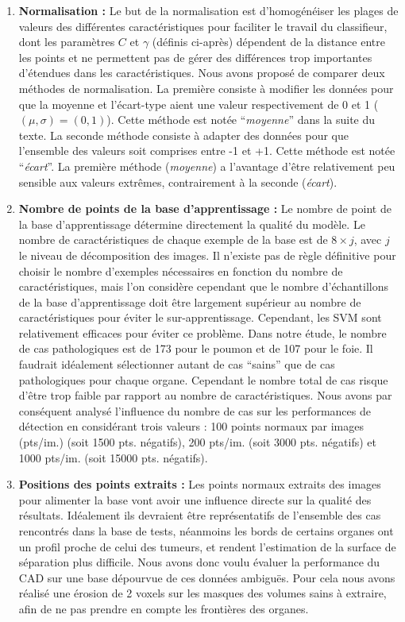 \begin{enumerate}
 \item \textbf{Normalisation :} Le but de la normalisation est d'homogénéiser les plages de valeurs des différentes caractéristiques pour faciliter le travail du classifieur, dont les paramètres $C$ et $\gamma$ (définis ci-après) dépendent de la distance entre les points et ne permettent pas de gérer des différences trop importantes d'étendues dans les caractéristiques.  Nous avons proposé de comparer deux méthodes de normalisation. La première consiste à modifier les données pour que la moyenne et l'écart-type aient une valeur respectivement de 0 et 1 ($(\mu, \sigma)=(0,1)$). Cette méthode est notée ``\emph{moyenne}'' dans la suite du texte. La seconde méthode consiste à adapter des données pour que l'ensemble des valeurs soit comprises entre -1 et +1. Cette méthode est notée ``\emph{écart}''. La première méthode (\emph{moyenne}) a l'avantage d'être relativement peu sensible aux valeurs extrêmes, contrairement à la seconde (\emph{écart}).


 \item \textbf{Nombre de points de la base d'apprentissage :} Le nombre de point de la base d'apprentissage détermine directement la qualité du modèle. Le nombre de caractéristiques de chaque exemple de la base est de $8 \times j$, avec $j$ le niveau de décomposition des images. Il n'existe pas de règle définitive pour choisir le nombre d'exemples nécessaires en fonction du nombre de caractéristiques, mais l'on considère cependant que le nombre d'échantillons de la base d'apprentissage doit être largement supérieur au nombre de caractéristiques pour éviter le sur-apprentissage. Cependant, les SVM sont relativement efficaces pour éviter ce problème. Dans notre étude, le nombre de cas pathologiques est de 173 pour le poumon et de 107 pour le foie. Il faudrait idéalement sélectionner autant de cas ``sains'' que de cas pathologiques pour chaque organe. Cependant le nombre total de cas risque d'être trop faible par rapport au nombre de caractéristiques. Nous avons par conséquent analysé l'influence du nombre de cas sur les performances de détection en considérant trois valeurs : 100 points normaux par images (pts/im.) (soit 1500 pts. négatifs), 200 pts/im. (soit 3000 pts. négatifs) et 1000 pts/im. (soit 15000 pts. négatifs).


 \item \textbf{Positions des points extraits :} Les points normaux extraits des images pour alimenter la base vont avoir une influence directe sur la qualité des résultats. Idéalement ils devraient être représentatifs de l'ensemble des cas rencontrés dans la base de tests, néanmoins les bords de certains organes ont un profil proche de celui des tumeurs, et rendent l'estimation de la surface de séparation plus difficile. Nous avons donc voulu évaluer la performance du CAD sur une base dépourvue de ces données ambiguës. Pour cela nous avons réalisé une érosion de 2 voxels sur les masques des volumes sains à extraire, afin de ne pas prendre en compte les frontières des organes.
\end{enumerate}



